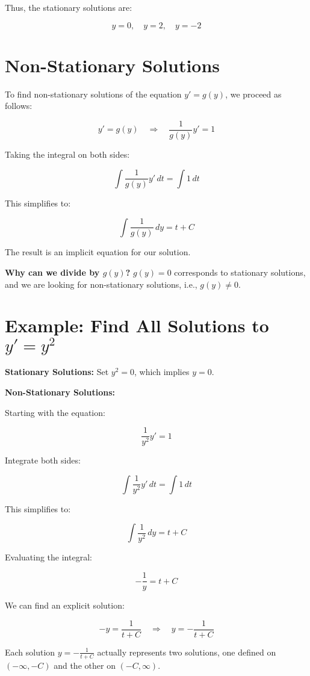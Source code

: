 \documentclass{article}
\begin{document}
Thus, the stationary solutions are:

\[
y = 0, \quad y = 2, \quad y = -2
\]




\section*{Non-Stationary Solutions}

To find non-stationary solutions of the equation \( y' = g(y) \), we proceed as follows:

\[
y' = g(y) \quad \Rightarrow \quad \frac{1}{g(y)} y' = 1 
\]

Taking the integral on both sides:

\[
\int \frac{1}{g(y)} y' \, dt = \int 1 \, dt
\]

This simplifies to:

\[
\int \frac{1}{g(y)} \, dy = t + C
\]

The result is an implicit equation for our solution.

\textbf{Why can we divide by \( g(y) \)?}  
\( g(y) = 0 \) corresponds to stationary solutions, and we are looking for non-stationary solutions, i.e., \( g(y) \neq 0 \).

\section*{Example: Find All Solutions to \( y' = y^2 \)}

\textbf{Stationary Solutions:}  
Set \( y^2 = 0 \), which implies \( y = 0 \).

\textbf{Non-Stationary Solutions:}

Starting with the equation:

\[
\frac{1}{y^2} y' = 1
\]

Integrate both sides:

\[
\int \frac{1}{y^2} y' \, dt = \int 1 \, dt
\]

This simplifies to:

\[
\int \frac{1}{y^2} \, dy = t + C
\]

Evaluating the integral:

\[
-\frac{1}{y} = t + C
\]

We can find an explicit solution:

\[
-y = \frac{1}{t + C} \quad \Rightarrow \quad y = -\frac{1}{t + C}
\]



Each solution \( y = -\frac{1}{t + C} \) actually represents two solutions, one defined on \( (-\infty, -C) \) and the other on \( (-C, \infty) \).
\end{document}
